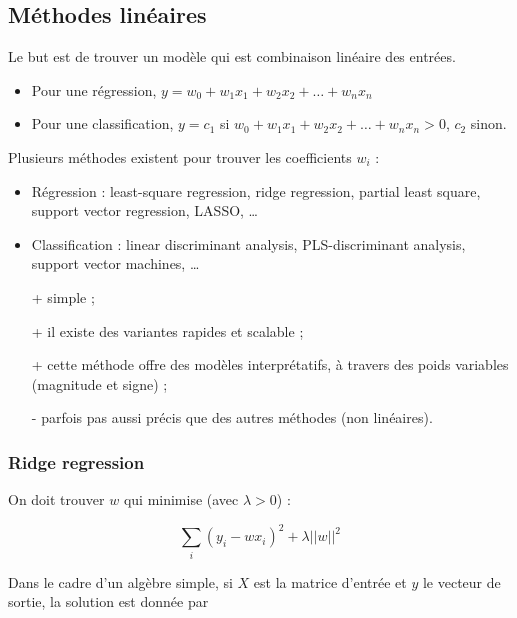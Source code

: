 \subsection{Méthodes linéaires}

Le but est de trouver un modèle qui est combinaison linéaire des entrées.

\begin{itemize}
	\item Pour une régression, $y = w_0 + w_1 x_1 + w_2 x_2 + \dots + w_n x_n$
	\item Pour une classification, $y = c_1$ si $w_0 + w_1 x_1 + w_2 x_2 + \dots + w_n x_n > 0$, $c_2$ sinon.
\end{itemize}


Plusieurs méthodes existent pour trouver les coefficients $w_i$ : 

\begin{itemize}
	\item Régression : least-square regression, ridge regression, partial least square, support vector regression, LASSO, \dots
	\item Classification : linear discriminant analysis, PLS-discriminant analysis, support vector machines, \dots \\
\end{itemize} 

\begin{itemize}
	\item[+] simple ;
	\item[+] il existe des variantes rapides et scalable ;
	\item[+] cette méthode offre des modèles interprétatifs, à travers des poids variables (magnitude et signe) ;
	\item[-] parfois pas aussi précis que des autres méthodes (non linéaires).
\end{itemize}

	\subsubsection{Ridge regression}
	
	On doit trouver $w$ qui minimise (avec $\lambda > 0$) :
	
	$$\sum_i (y_i - wx_i)^2 + \lambda \vert \vert w \vert \vert^2$$
	
	Dans le cadre d'un algèbre simple, si $X$ est la matrice d'entrée et $y$ le vecteur de sortie, la solution est donnée par
	
